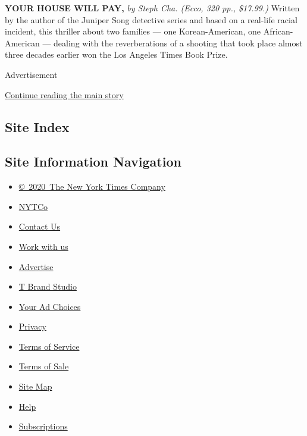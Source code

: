 \textbf{\textbf{YOUR HOUSE WILL PAY,}} \emph{by Steph Cha. (Ecco, 320
pp., \$17.99.)} Written by the author of the Juniper Song detective
series and based on a real-life racial incident, this thriller about two
families --- one Korean-American, one African-American --- dealing with
the reverberations of a shooting that took place almost three decades
earlier won the Los Angeles Times Book Prize.

Advertisement

\protect\hyperlink{after-bottom}{Continue reading the main story}

\hypertarget{site-index}{%
\subsection{Site Index}\label{site-index}}

\hypertarget{site-information-navigation}{%
\subsection{Site Information
Navigation}\label{site-information-navigation}}

\begin{itemize}
\tightlist
\item
  \href{https://help.nytimes3xbfgragh.onion/hc/en-us/articles/115014792127-Copyright-notice}{©~2020~The
  New York Times Company}
\end{itemize}

\begin{itemize}
\tightlist
\item
  \href{https://www.nytco.com/}{NYTCo}
\item
  \href{https://help.nytimes3xbfgragh.onion/hc/en-us/articles/115015385887-Contact-Us}{Contact
  Us}
\item
  \href{https://www.nytco.com/careers/}{Work with us}
\item
  \href{https://nytmediakit.com/}{Advertise}
\item
  \href{http://www.tbrandstudio.com/}{T Brand Studio}
\item
  \href{https://www.nytimes3xbfgragh.onion/privacy/cookie-policy\#how-do-i-manage-trackers}{Your
  Ad Choices}
\item
  \href{https://www.nytimes3xbfgragh.onion/privacy}{Privacy}
\item
  \href{https://help.nytimes3xbfgragh.onion/hc/en-us/articles/115014893428-Terms-of-service}{Terms
  of Service}
\item
  \href{https://help.nytimes3xbfgragh.onion/hc/en-us/articles/115014893968-Terms-of-sale}{Terms
  of Sale}
\item
  \href{https://spiderbites.nytimes3xbfgragh.onion}{Site Map}
\item
  \href{https://help.nytimes3xbfgragh.onion/hc/en-us}{Help}
\item
  \href{https://www.nytimes3xbfgragh.onion/subscription?campaignId=37WXW}{Subscriptions}
\end{itemize}
